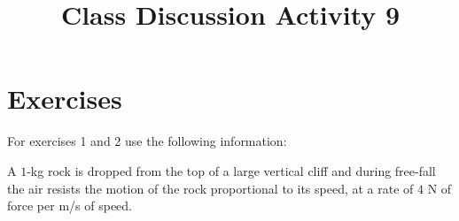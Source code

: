 \documentclass{ximera}
\begin{document}
\begin{abstract}
 \end{abstract}

    \title{Class Discussion Activity 9}
    
    \maketitle

\section*{Exercises}

For exercises 1 and 2 use the following information:

A $1$-kg rock is dropped from the top of a large vertical cliff and during free-fall the air resists the motion of the rock proportional to its speed, at a rate of $4$ N of force per m/s of speed.
\end{document}
